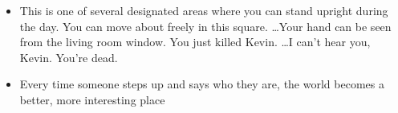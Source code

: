 %
\begin{itemize}
    \item {} This is one of several designated areas where you can stand upright during the day.
    You can move about freely in this square.
    \ldots Your hand can be seen from the living room window.
    You just killed Kevin.
    \ldots I can't hear you, Kevin.
    You're dead.
    \item {} Every time someone steps up and says who they are, the world becomes a better, more interesting place
\end{itemize}